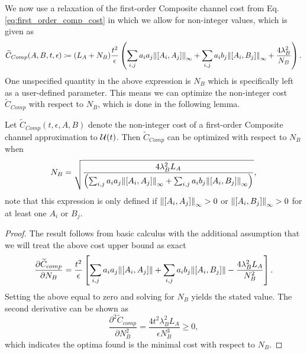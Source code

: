 We now use a relaxation of the first-order Composite channel cost from Eq. \eqref{eq:first_order_comp_cost} in which we allow for non-integer values, which is given as 
\begin{equation}
\widetilde{C}_{Comp}(A, B, t, \epsilon) \coloneqq (L_A + N_B) \frac{t^2}{\epsilon} \left( \sum_{i,j} a_i a_j \norm{[A_i, A_j]}_{\infty} + \sum_{i,j} a_i b_j \norm{[A_i, B_j]}_{\infty} + \frac{4 \lambda_B^2}{N_B} \right).
\end{equation}
One unspecified quantity in the above expression is $N_B$ which is specifically left as a user-defined parameter. This means we can optimize the non-integer cost $\widetilde{C}_{Comp}$ with respect to $N_B$, which is done in the following lemma.
\begin{lemma}\label{lem:first_order_opt_nb}
Let $\widetilde{C}_{Comp}(t, \epsilon, A, B)$ denote the non-integer cost of a first-order Composite channel approximation to $\mathcal{U}(t)$. Then $\widetilde{C}_{Comp}$ can be optimized with respect to $N_B$ when
\begin{equation}
    N_B = \sqrt{\frac{4 \lambda_B^2 L_A}{\left( \sum_{i,j} a_i a_j \norm{[A_i, A_j]}_{\infty} + \sum_{i, j} a_i b_j \norm{[A_i, B_j]}_{\infty} \right)}},
\end{equation}
note that this expression is only defined if $\norm{[A_i, A_j]}_{\infty} > 0$ or $\norm{[A_i, B_j]}_{\infty} > 0$ for at least one $A_i$ or $B_j$.
\begin{proof}
The result follows from basic calculus with the additional assumption that we will treat the above cost upper bound as exact
\begin{align}
    \frac{\partial \widetilde{C}_{comp}}{\partial N_B} = \frac{t^2}{\epsilon} \left[ \sum_{i,j} a_i a_j \norm{[A_i, A_j]} + \sum_{i, j} a_i b_j \norm{[A_i, B_j]}  - \frac{4 \lambda_B^2 L_A}{N_B^2}  \right].
\end{align}
Setting the above equal to zero and solving for $N_B$ yields the stated value. The second derivative can be shown as 
\begin{equation}
    \frac{\partial^2 \widetilde{C}_{comp}}{\partial N_B^2} = \frac{4 t^2 \lambda_B^2 L_A}{\epsilon N_B^3} \geq 0,
\end{equation}
which indicates the optima found is the minimal cost with respect to $N_B$.
\end{proof}
\end{lemma}

